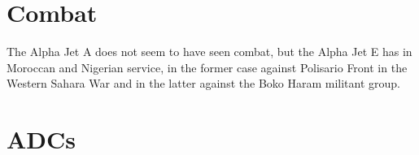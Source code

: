 \section{Combat}

The Alpha Jet A does not seem to have seen combat, but the Alpha Jet E has in Moroccan and Nigerian service, in the former case against Polisario Front in the Western Sahara War and in the latter against the Boko Haram militant group.

\section{ADCs}

\begin{adclist}
\end{adclist}

\clearpage
\listofnotes
